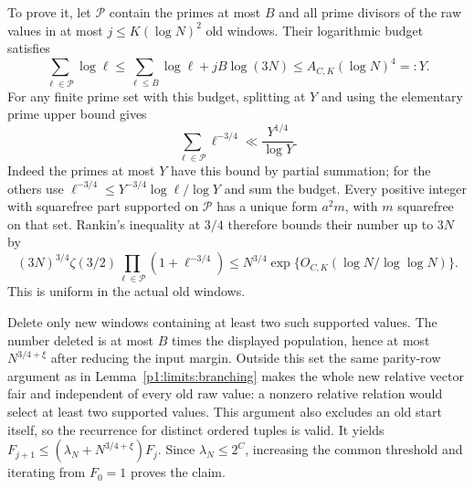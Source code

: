 To prove it, let $\mathcal P$ contain the primes at most $B$ and
all prime divisors of the raw values in at most $j\le K(\log N)^2$
old windows. Their logarithmic budget satisfies
\[
 \sum_{\ell\in\mathcal P}\log\ell
 \le \sum_{\ell\le B}\log\ell+jB\log(3N)
 \le A_{C,K}(\log N)^4=:Y .
\]
For any finite prime set with this budget, splitting at $Y$ and
using the elementary prime upper bound gives
\[
 \sum_{\ell\in\mathcal P}\ell^{-3/4}
 \ll\frac{Y^{1/4}}{\log Y}.
\]
Indeed the primes at most $Y$ have this bound by partial summation;
for the others use
$\ell^{-3/4}\le Y^{-3/4}\log\ell/\log Y$ and sum the budget.
Every positive integer with squarefree part supported on $\mathcal P$
has a unique form $a^2m$, with $m$ squarefree on that set.
Rankin's inequality at $3/4$ therefore bounds their number up to $3N$ by
\[
 (3N)^{3/4}\zeta(3/2)
       \prod_{\ell\in\mathcal P}(1+\ell^{-3/4})
 \le N^{3/4}\exp\{O_{C,K}(\log N/\log\log N)\}.
\]
This is uniform in the actual old windows.

Delete only new windows containing at least two such supported
values. The number deleted is at most $B$ times the displayed
population, hence at most $N^{3/4+\xi}$ after reducing the input
margin. Outside this set the same parity-row argument as in
Lemma~\ref{p1:limits:branching} makes the whole new relative vector
fair and independent of every old raw value: a nonzero relative
relation would select at least two supported values.
This argument also excludes an old start itself, so the recurrence
for distinct ordered tuples is valid. It yields
$F_{j+1}\le(\lambda_N+N^{3/4+\xi})F_j$.
Since $\lambda_N\le2^C$, increasing the common threshold and
iterating from $F_0=1$ proves the claim.

